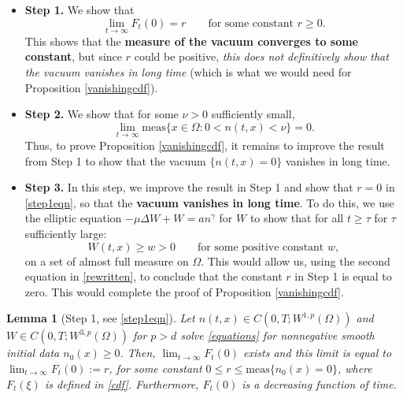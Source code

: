\documentclass[12pt]{article}
\theoremstyle{plain}
\newtheorem{lemma}{Lemma}[section]
\begin{document}
\begin{itemize}
    \item \textbf{Step 1.} We show that 
    \begin{equation}\label{step1eqn}
    \lim_{t \to \infty} F_{t}(0) = r \qquad \text{for some constant $r \ge 0$}.
    \end{equation}
    This shows that the \textbf{measure of the vacuum converges to some constant}, but since $r$ could be positive, \textit{this does not definitively show that the vacuum vanishes in long time} (which is what we would need for Proposition \ref{vanishingcdf}).
    \item \textbf{Step 2.} We show that for some $\nu > 0$ sufficiently small,
    \begin{equation}\label{step2eqn}
        \lim_{t \to \infty} \text{meas}\{x \in \Omega : 0 < n(t, x) < \nu\} = 0.
    \end{equation}
    Thus, to prove Proposition \ref{vanishingcdf}, it remains to improve the result from Step 1 to show that the vacuum $\{n(t, x) = 0\}$ vanishes in long time.
    \item \textbf{Step 3.} In this step, we improve the result in Step 1 and show that $r = 0$ in \eqref{step1eqn}, so that the \textbf{vacuum vanishes in long time}. To do this, we use the elliptic equation $-\mu \Delta W + W = an^{\gamma}$ for $W$ to show that for all $t \ge \tau$ for $\tau$ sufficiently large:
    \begin{equation}\label{step3eqn}
    W(t, x) \ge w > 0 \qquad \text{for some positive constant $w$},
    \end{equation}
    on a set of almost full measure on $\Omega$. This would allow us, using the second equation in \eqref{rewritten}, to conclude that the constant $r$ in Step 1 is equal to zero. This would complete the proof of Proposition \ref{vanishingcdf}. 
\end{itemize}

\begin{lemma}[Step 1, see \eqref{step1eqn}]\label{step1}
Let $n(t, x) \in C(0, T; W^{1, p}(\Omega))$ and $W \in C(0, T; W^{3, p}(\Omega))$ for $p > d$ solve \eqref{equations} for nonnegative smooth initial data $n_{0}(x) \ge 0$. Then, $\lim_{t \to \infty} F_{t}(0)$ exists and this limit is equal to $\lim_{t \to \infty} F_{t}(0) := r$, for some constant $0 \le r \le \text{meas}\{n_{0}(x) = 0\}$, where $F_{t}(\xi)$ is defined in \eqref{cdf}. Furthermore, $F_{t}(0)$ is a decreasing function of time.
\end{lemma}
\end{document}
